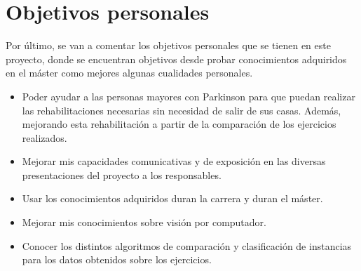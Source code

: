\section{Objetivos personales}
Por último, se van a comentar los objetivos personales que se tienen en este proyecto, donde se encuentran objetivos desde probar conocimientos adquiridos en el máster como mejores algunas cualidades personales.
\begin{itemize}
	\item Poder ayudar a las personas mayores con Parkinson para que puedan realizar las rehabilitaciones necesarias sin necesidad de salir de sus casas. Además, mejorando esta rehabilitación a partir de la comparación de los ejercicios realizados.
	\item Mejorar mis capacidades comunicativas y de exposición en las diversas presentaciones del proyecto a los responsables.
	\item Usar los conocimientos adquiridos duran la carrera y duran el máster.
	\item Mejorar mis conocimientos sobre visión por computador.
	\item Conocer los distintos algoritmos de comparación y clasificación de instancias para los datos obtenidos sobre los ejercicios.
\end{itemize} 

